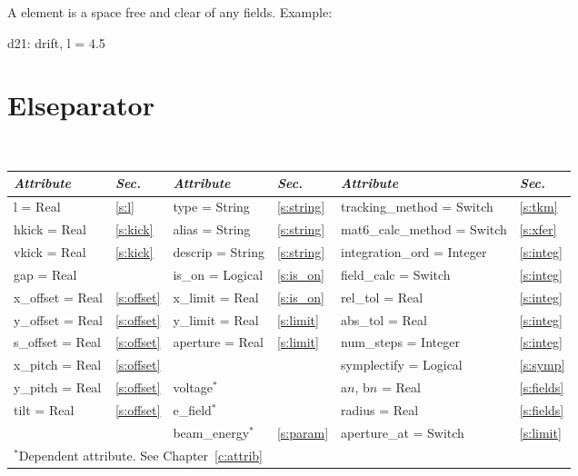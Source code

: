 A  element is a space free and clear of any fields.
Example:
\begin{example}
  d21: drift, l = 4.5
\end{example}

\section{Elseparator}
\label{s:elsep}

\begin{center}
\tt
\begin{tabular}{|l|l||l|l||l|l|} \hline
  {\sl Attribute} & {\sl Sec.}  & {\sl Attribute} & {\sl Sec.} & {\sl Attribute} & {\sl Sec.} \\ \hline
  l        = Real       & \ref{s:l}      & type = String    & \ref{s:string} & tracking\_method = Switch   & \ref{s:tkm}    \\ \hline
  hkick    = Real       & \ref{s:kick}   & alias = String   & \ref{s:string} & mat6\_calc\_method = Switch & \ref{s:xfer}   \\ \hline
  vkick    = Real       & \ref{s:kick}   & descrip = String & \ref{s:string} & integration\_ord = Integer  & \ref{s:integ}  \\ \hline
  gap      = Real       &                & is\_on = Logical & \ref{s:is_on}  & field\_calc = Switch        & \ref{s:integ}  \\ \hline
  x\_offset  = Real     & \ref{s:offset} & x\_limit = Real  & \ref{s:is_on}  & rel\_tol = Real             & \ref{s:integ}  \\ \hline
  y\_offset  = Real     & \ref{s:offset} & y\_limit = Real  & \ref{s:limit}  & abs\_tol = Real             & \ref{s:integ}  \\ \hline
  s\_offset  = Real     & \ref{s:offset} & aperture = Real  & \ref{s:limit}  & num\_steps = Integer        & \ref{s:integ}  \\ \hline
  x\_pitch = Real       & \ref{s:offset} &                  &                & symplectify = Logical       & \ref{s:symp}   \\ \hline
  y\_pitch = Real       & \ref{s:offset} & voltage$^*$      &                & a$n$, b$n$ = Real           & \ref{s:fields} \\ \hline
  tilt     = Real       & \ref{s:offset} & e\_field$^*$     &                & radius = Real               & \ref{s:fields} \\ \hline
                        &                & beam\_energy$^*$ & \ref{s:param}  & aperture\_at = Switch       & \ref{s:limit}  \\ \hline
  \multicolumn{6}{l}{\small $^*$Dependent attribute. See Chapter~\ref{c:attrib}} \\
\end{tabular}
\end{center}
\toffset

